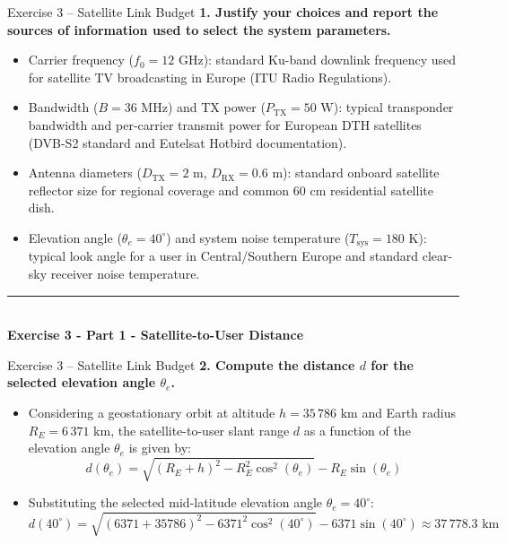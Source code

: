 \documentclass[10pt, aspectratio=169]{beamer}
\newcommand{\question}[1]{{\color{QuestionRed}\textbf{#1}}}
\begin{document}
	\begin{frame}{Exercise 3 -- Satellite Link Budget}
		\question{1. Justify your choices and report the sources of information used to select the system parameters.}
		
		\vspace{0.1cm}
		\begin{itemize}
			\item Carrier frequency ($f_0 = 12\text{ GHz}$): standard Ku-band downlink frequency used for satellite TV broadcasting in Europe (ITU Radio Regulations).
			\item Bandwidth ($B = 36\text{ MHz}$) and TX power ($P_{\text{TX}} = 50\text{ W}$): typical transponder bandwidth and per-carrier transmit power for European DTH satellites (DVB-S2 standard and Eutelsat Hotbird documentation).
			\item Antenna diameters ($D_{\text{TX}} = 2\text{ m}$, $D_{\text{RX}} = 0.6\text{ m}$): standard onboard satellite reflector size for regional coverage and common $60\text{ cm}$ residential satellite dish.
			\item Elevation angle ($\theta_e = 40^\circ$) and system noise temperature ($T_{\text{sys}} = 180\text{ K}$): typical look angle for a user in Central/Southern Europe and standard clear-sky receiver noise temperature.
		\end{itemize}
		
	\end{frame}
	
	\begin{frame}[plain]
		\vfill
		\centering
		{\color{TealAccent}\rule{2cm}{2pt}}\\[0.4cm]
		{\LARGE\bfseries\color{NavyPrimary} Exercise 3 - Part 1 - Satellite-to-User Distance}\\[0.2cm]
		\vfill
	\end{frame}
	
	\begin{frame}{Exercise 3 -- Satellite Link Budget}
		\question{2. Compute the distance $d$ for the selected elevation angle $\theta_e$.}
		
		\vspace{0.1cm}
		\begin{itemize}
			\item Considering a geostationary orbit at altitude $h = 35\,786\text{ km}$ and Earth radius $R_E = 6\,371\text{ km}$, the satellite-to-user slant range $d$ as a function of the elevation angle $\theta_e$ is given by:
			\[
			d(\theta_e) = \sqrt{(R_E + h)^2 - R_E^2 \cos^2(\theta_e)} - R_E \sin(\theta_e)
			\]
			\item Substituting the selected mid-latitude elevation angle $\theta_e = 40^\circ$:
			\[
			d(40^\circ) = \sqrt{(6371 + 35786)^2 - 6371^2 \cos^2(40^\circ)} - 6371 \sin(40^\circ) \approx 37\,778.3\text{ km}
			\]
		\end{itemize}
		
	\end{frame}
	
\end{document}
